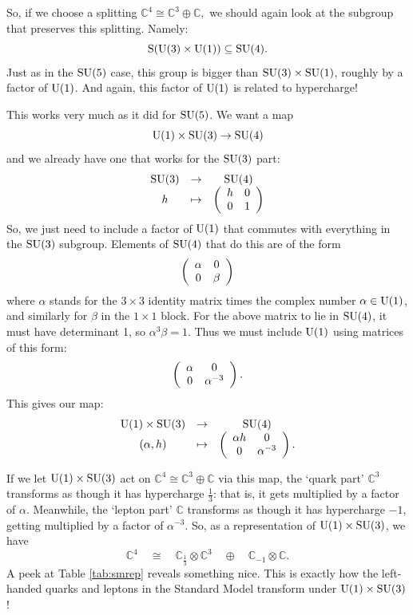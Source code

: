 \documentclass{article}
\newcommand{\C}{{\mathbb C}}  %
\newcommand{\U}{{\rm U}}    %
\renewcommand{\S}{{\rm S}}    %
\newcommand{\SU}{{\rm SU}}    %
\newcommand{\iso}{\cong} %
\newcommand{\third}{\frac{1}{3}} %
\begin{document}
So, if we choose a splitting $\C^4 \iso \C^3 \oplus \C,$ 
we should again look at the subgroup that preserves this splitting. 
Namely:
\[ \S(\U(3) \times \U(1)) \subseteq \SU(4) .\]
Just as in the $\SU(5)$ case, this group is bigger than $\SU(3) \times
\SU(1)$, roughly by a factor of $\U(1)$.  And again, this factor of $\U(1)$ 
is related to hypercharge!

This works very much as it did for $\SU(5)$.  We want a map
\[ \U(1) \times \SU(3) \to \SU(4) \]
and we already have one that works for the $\SU(3)$ part:
\[
\begin{array}{ccc}
 \SU(3) &\to & \SU(4) \\
 h &\mapsto & 
\left(
\begin{array}{cc}
	h & 0 \\
	0 & 1
\end{array}
\right)
\end{array}
\]
So, we just need to include a factor of $\U(1)$ that commutes
with everything in the $\SU(3)$ subgroup. 
Elements of $\SU(4)$ that do this are of the form
\[
\left( 
\begin{array}{c c}
\alpha & 0 \\
0 & \beta
\end{array}
\right)
\]
where $\alpha$ stands for
the $3 \times 3$ identity matrix times
the complex number $\alpha \in \U(1)$, and similarly for $\beta$ in the
$1 \times 1$ block.  For the above matrix to lie in $\SU(4)$, it
must have determinant 1, so $\alpha^3 \beta = 1$.  Thus we
must include $\U(1)$ using matrices of this form:
\[
\left( 
\begin{array}{c c}
\alpha & 0 \\
0 & \alpha^{-3}
\end{array}
\right).
\]
This gives our map:
\[
\begin{array}{ccc}
 \U(1) \times \SU(3) &\to& \SU(4)  \\
( \alpha, h) &\mapsto &
\left( 
\begin{array}{c c}
\alpha h & 0 \\
0 & \alpha^{-3}
\end{array}
\right) .
\end{array}
\]

If we let $\U(1) \times \SU(3)$
act on $\C^4 \iso \C^3 \oplus \C$ via this map, the `quark part' 
$\C^3$ transforms as though it has
hypercharge $\third$: that is, it gets multiplied by a factor of $\alpha$.
Meanwhile, the `lepton part' $\C$ transforms as though it has 
hypercharge $-1$, getting multiplied by a factor of $\alpha^{-3}$.  
So, as a representation of $\U(1) \times \SU(3)$, we have
\[ \C^4 \quad \iso \quad
\C_{\third} \otimes \C^3 \quad \oplus \quad \C_{-1} \otimes \C .\]
A peek at Table \ref{tab:smrep} reveals something nice.
This is exactly how the left-handed quarks and leptons 
in the Standard Model transform under $\U(1) \times \SU(3)$!  
\end{document}
